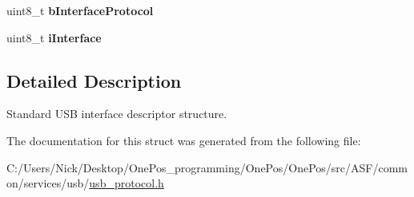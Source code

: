 \begin{DoxyCompactItemize}
\item 
\hypertarget{structusb__iface__desc__t_a3f8436d03bdd0ca6691c3ead758b9f4a}{uint8\-\_\-t {\bfseries b\-Interface\-Protocol}}\label{structusb__iface__desc__t_a3f8436d03bdd0ca6691c3ead758b9f4a}

\item 
\hypertarget{structusb__iface__desc__t_a44cb19ca24e0659fcb3fa7e2522711bb}{uint8\-\_\-t {\bfseries i\-Interface}}\label{structusb__iface__desc__t_a44cb19ca24e0659fcb3fa7e2522711bb}

\end{DoxyCompactItemize}


\subsection{Detailed Description}
Standard U\-S\-B interface descriptor structure. 

The documentation for this struct was generated from the following file\-:\begin{DoxyCompactItemize}
\item 
C\-:/\-Users/\-Nick/\-Desktop/\-One\-Pos\-\_\-programming/\-One\-Pos/\-One\-Pos/src/\-A\-S\-F/common/services/usb/\hyperlink{usb__protocol_8h}{usb\-\_\-protocol.\-h}\end{DoxyCompactItemize}
